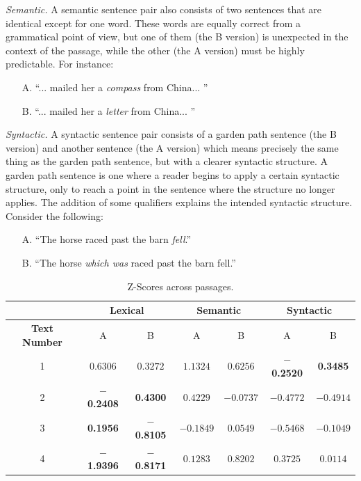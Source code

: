 \documentclass[11pt,letterpaper]{article}
\begin{document}
	\textit{Semantic.} A semantic sentence pair also consists of two sentences that are identical except for one word. These words are equally correct from a grammatical point of view, but one of them (the B version) is unexpected in the context of the passage, while the other (the A version) must be highly predictable. For instance:
	\begin{itemize}[noitemsep, nolistsep]
		\item[A.] ``... mailed her a \textit{compass} from China... ''
		\item[B.] ``... mailed her a \textit{letter} from China... ''
	\end{itemize}
	
	\textit{Syntactic.} A syntactic sentence pair consists of a garden path sentence (the B version) and another sentence (the A version) which means precisely the same thing as the garden path sentence, but with a clearer syntactic structure. A garden path sentence is one where a reader begins to apply a certain syntactic structure, only to reach a point in the sentence where the structure no longer applies. The addition of some qualifiers explains the intended syntactic structure. Consider the following:
	\begin{itemize}[noitemsep, nolistsep]
		\item[A.] ``The horse raced past the barn \textit{fell}.''
		\item[B.] ``The horse \textit{which was} raced past the barn fell.''
	\end{itemize}
	
	
	\begin{table}[t]
		\begin{center}
			\begin{tabular}{*7c}
				\toprule
				 & \multicolumn{2}{c}{\textbf{Lexical}} & \multicolumn{2}{c}{\textbf{Semantic}} & \multicolumn{2}{c}{\textbf{Syntactic}} \\
				\midrule
				\textbf{Text Number} & A & B & A & B & A & B \\
				1 & $ 0.6306 $ & $ 0.3272 $ & $ 1.1324 $ & $ 0.6256 $ & $-$\textbf{0.2520} & \textbf{0.3485} \\
				2 & $-$\textbf{0.2408} & \textbf{0.4300} & $ 0.4229 $ & $ -0.0737 $ & $ -0.4772 $ & $ -0.4914 $ \\
				3 & \textbf{0.1956} & $-$\textbf{0.8105} & $ -0.1849 $ & $ 0.0549 $ & $ -0.5468 $ & $ -0.1049 $ \\
				4 & $-$\textbf{1.9396} & $-$\textbf{0.8171} & $ 0.1283 $ & $ 0.8202 $ & $ 0.3725 $ & $ 0.0114 $ \\
				\bottomrule
			\end{tabular}
		\end{center}
		\caption{Z-Scores across passages.}
	\end{table}
	
\end{document}
